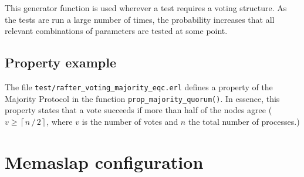 \documentclass[12pt,chapterprefix=true,toc=bibliography,numbers=noendperiod,
               footnotes=multiple,twoside]{scrreprt}
\begin{document}
This generator function is used wherever a test requires a voting structure. As the tests are run a large number of times, the probability increases that all relevant combinations of parameters are tested at some point.

\subsection{Property example}
\label{ssc:property}

The file \texttt{test/rafter\_voting\_majority\_eqc.erl} defines a property of the Majority Protocol in the function \texttt{prop\_majority\_quorum()}. In essence, this property states that a vote succeeds if more than half of the nodes agree (\(v \ge \left\lceil n \, / \, 2 \right\rceil \), where \(v\) is the number of votes and \(n\) the total number of processes.)





\newpage

\section{Memaslap configuration}
\label{sc:memaslap-conf}
\end{document}

